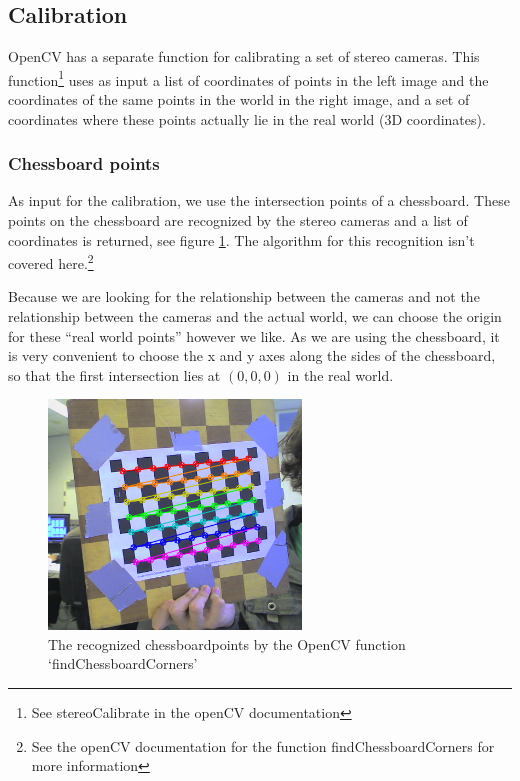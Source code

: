 \documentclass[a4paper]{article}
\begin{document}
\subsection{Calibration}
\label{calib_implement}
OpenCV has a separate function for calibrating a set of stereo cameras. This function\footnote{See stereoCalibrate in the openCV documentation} uses as input a list of coordinates of points in the left image and the coordinates of the same points in the world in the right image, and a set of coordinates where these points actually lie in the real world (3D coordinates).

\subsubsection{Chessboard points}
As input for the calibration, we use the intersection points of a chessboard. These points on the chessboard are recognized by the stereo cameras and a list of coordinates is returned, see figure \ref{chessboardcorners}. The algorithm for this recognition isn't covered here.\footnote{See the openCV documentation for the function findChessboardCorners for more information}

Because we are looking for the relationship between the cameras and not the relationship between the cameras
and the actual world, we can choose the origin for these ``real world points'' however we like. As we are using the chessboard, it is very convenient to choose the x and y axes along the sides of the chessboard, so that the first intersection lies at $(0, 0, 0)$ in the real world.

\begin{figure}
  \centering
  \includegraphics[width=0.6\textwidth]{chessboardcorners}
  \caption{The recognized chessboardpoints by the OpenCV function `findChessboardCorners'\label{chessboardcorners}}
\end{figure}
\end{document}
